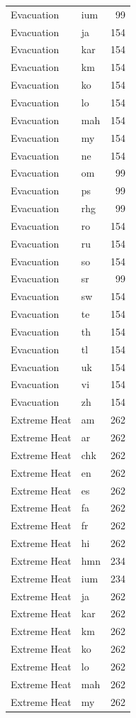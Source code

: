 \begin{longtable}{p{3cm} p{3cm} r}
Evacuation & ium & 99 \\
Evacuation & ja & 154 \\
Evacuation & kar & 154 \\
Evacuation & km & 154 \\
Evacuation & ko & 154 \\
Evacuation & lo & 154 \\
Evacuation & mah & 154 \\
Evacuation & my & 154 \\
Evacuation & ne & 154 \\
Evacuation & om & 99 \\
Evacuation & ps & 99 \\
Evacuation & rhg & 99 \\
Evacuation & ro & 154 \\
Evacuation & ru & 154 \\
Evacuation & so & 154 \\
Evacuation & sr & 99 \\
Evacuation & sw & 154 \\
Evacuation & te & 154 \\
Evacuation & th & 154 \\
Evacuation & tl & 154 \\
Evacuation & uk & 154 \\
Evacuation & vi & 154 \\
Evacuation & zh & 154 \\
Extreme Heat & am & 262 \\
Extreme Heat & ar & 262 \\
Extreme Heat & chk & 262 \\
Extreme Heat & en & 262 \\
Extreme Heat & es & 262 \\
Extreme Heat & fa & 262 \\
Extreme Heat & fr & 262 \\
Extreme Heat & hi & 262 \\
Extreme Heat & hmn & 234 \\
Extreme Heat & ium & 234 \\
Extreme Heat & ja & 262 \\
Extreme Heat & kar & 262 \\
Extreme Heat & km & 262 \\
Extreme Heat & ko & 262 \\
Extreme Heat & lo & 262 \\
Extreme Heat & mah & 262 \\
Extreme Heat & my & 262 \\

\end{longtable}
